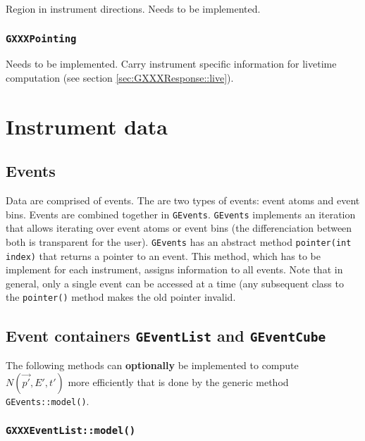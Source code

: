 \documentclass{article}[12pt,a4]
\begin{document}
Region in instrument directions.
Needs to be implemented.


\subsubsection{{\tt GXXXPointing}}
\label{sec:GPointing}

Needs to be implemented.
Carry instrument specific information for livetime computation 
(see section \ref{sec:GXXXResponse::live}).



\section{Instrument data}

\subsection{Events}

Data are comprised of events.
The are two types of events: event atoms and event bins.
Events are combined together in {\tt GEvents}.
{\tt GEvents} implements an iteration that allows iterating over event atoms or event bins
(the differenciation between both is transparent for the user).
{\tt GEvents} has an abstract method {\tt pointer(int index)} that returns a pointer to an
event.
This method, which has to be implement for each instrument, assigns information to
all events.
Note that in general, only a single event can be accessed at a time (any subsequent
class to the {\tt pointer()} method makes the old pointer invalid.


\subsection{Event containers {\tt GEventList} and {\tt GEventCube}}
\label{sec:GEvents}

The following methods can {\bf optionally} be implemented to compute $N(\vec{p'}, E', t')$
more efficiently that is done by the generic method {\tt GEvents::model()}.

\subsubsection{{\tt GXXXEventList::model()}}
\end{document}
